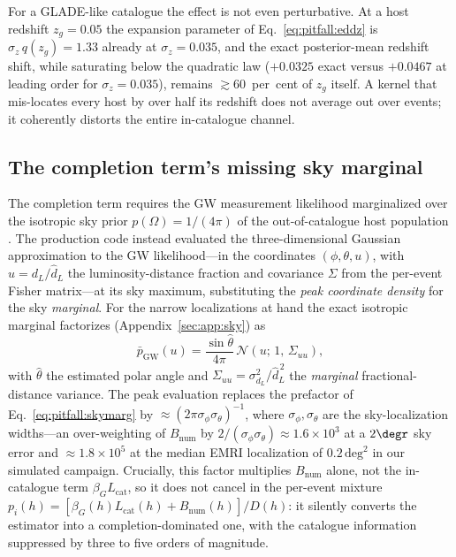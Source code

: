 For a GLADE-like catalogue the effect is not even perturbative. At a host redshift $z_g = 0.05$ the expansion parameter of Eq.~\eqref{eq:pitfall:eddz} is $\sigma_z\, q(z_g) = 1.33$ already at $\sigma_z = 0.035$, %
and the exact posterior-mean redshift shift, while saturating below the quadratic law ($+0.0325$ exact versus $+0.0467$ at leading order for $\sigma_z=0.035$), remains $\gtrsim 60$~per~cent of $z_g$ itself. %
A kernel that mis-locates every host by over half its redshift does not average out over events; it coherently distorts the entire in-catalogue channel.

\subsection{The completion term's missing sky marginal}
\label{sec:pitfall:sky}

The completion term requires the GW measurement likelihood marginalized over the isotropic sky prior $p(\Omega) = 1/(4\pi)$ of the out-of-catalogue host population \citep{Gray:2019ksv}. The production code instead evaluated the three-dimensional Gaussian approximation to the GW likelihood---in the coordinates $(\phi,\theta,u)$, with $u = d_L/\hat{d}_L$ the luminosity-distance fraction and covariance $\Sigma$ from the per-event Fisher matrix---at its sky maximum, substituting the \emph{peak coordinate density} for the sky \emph{marginal}. For the narrow localizations at hand the exact isotropic marginal factorizes (Appendix~\ref{sec:app:sky}) as
\begin{equation}
  \bar{p}_{\mathrm{GW}}(u)
  = \frac{\sin\hat{\theta}}{4\pi}\,
  \mathcal{N}\!\left(u;\,1,\,\Sigma_{uu}\right),
  \label{eq:pitfall:skymarg}
\end{equation}
with $\hat{\theta}$ the estimated polar angle and $\Sigma_{uu} = \sigma_{d_L}^2/\hat{d}_L^{\,2}$ the \emph{marginal} fractional-distance variance. The peak evaluation replaces the prefactor of Eq.~\eqref{eq:pitfall:skymarg} by $\approx (2\pi\sigma_\phi\sigma_\theta)^{-1}$, where $\sigma_\phi,\sigma_\theta$ are the sky-localization widths---an over-weighting of $B_{\mathrm{num}}$ by $2/(\sigma_\phi\sigma_\theta) \approx 1.6\times10^{3}$ at a $2\degr$ sky error %
and $\approx 1.8\times10^{5}$ at the median EMRI localization of $0.2\,\mathrm{deg}^2$ in our simulated campaign. %
Crucially, this factor multiplies $B_{\mathrm{num}}$ alone, not the in-catalogue term $\beta_G L_{\mathrm{cat}}$, so it does not cancel in the per-event mixture $p_i(h) = [\beta_G(h) L_{\mathrm{cat}}(h) + B_{\mathrm{num}}(h)]/D(h)$: it silently converts the estimator into a completion-dominated one, with the catalogue information suppressed by three to five orders of magnitude.

